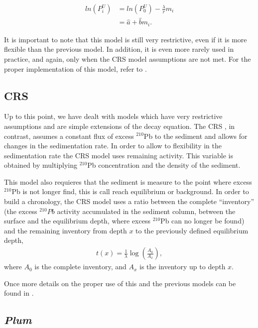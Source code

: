 \documentclass [10pt] {article}
\begin{document}
\begin{eqnarray}
	ln(P_i^U) &= ln(P_0^U) - \frac{\lambda}{r}m_i \\
		   &= \hat{a} + \hat{b}m_i.
\end{eqnarray}

It is important to note that this model is still very restrictive, even if it is more flexible than the previous model. 
In addition, it is even more rarely used in practice, and again, only when the CRS model assumptions are not met.
For the proper implementation of this model, refer to \citet{Sanchez-Cabeza2012}.


\subsection{CRS}

Up to this point, we have dealt with models which have very restrictive assumptions and are simple extensions of the decay equation. 
The CRS \citep{Appleby1978,Appleby1998,Appleby2001,Appleby2008}, in contrast, assumes a constant flux of excess $^{210}$Pb to the sediment and allows for changes in the sedimentation rate. In order to allow to flexibility in the sedimentation rate the CRS model uses remaining activity.
This variable is obtained by multiplying $^{210}$Pb concentration and the density of the sediment.  

This model also requieres that the sediment is measure to the point where excess $^{210}$Pb is not longer find, this is call reach equilibrium or background.
In order to build a chronology, the CRS model uses a ratio between the complete ``inventory'' (the excess $^{210}Pb$ activity accumulated in the sediment column, between the surface and the equilibrium depth, where excess $^{210}$Pb  can no longer be found) and the remaining  inventory from depth $x$ to the previously defined equilibrium depth, 
\begin{eqnarray}
	t(x)=\frac{1}{\lambda}\log\left( \frac{A_0}{A_x}\right),
\end{eqnarray}
where $A_0$ is the complete inventory, and $A_x$ is the inventory up to depth $x$.


Once more details on the proper use of this and the previous models can be found in \citet{Sanchez-Cabeza2012}.

\subsection{\textit{Plum}}
\end{document}
